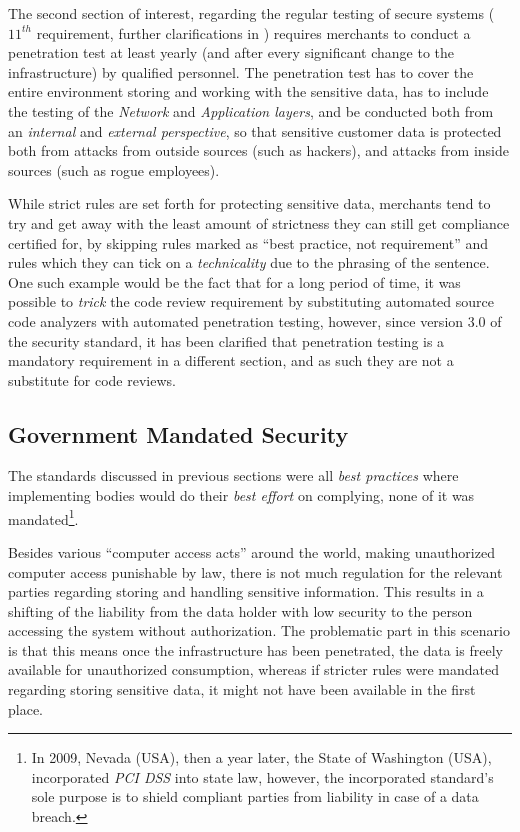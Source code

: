 \documentclass[a4paper,12pt]{article}
\begin{document}
	The second section of interest, regarding the regular testing of secure systems ($11^{th}$ requirement, further clarifications in \cite{pcireq11}) requires merchants to conduct a penetration test at least yearly (and after every significant change to the infrastructure) by qualified personnel. The penetration test has to cover the entire environment storing and working with the sensitive data, has to include the testing of the \textit{Network} and \textit{Application layers}, and be conducted both from an \textit{internal} and \textit{external perspective}, so that sensitive customer data is protected both from attacks from outside sources (such as hackers), and attacks from inside sources (such as rogue employees).
	
	While strict rules are set forth for protecting sensitive data, merchants tend to try and get away with the least amount of strictness they can still get compliance certified for, by skipping rules marked as ``best practice, not requirement'' and rules which they can tick on a \textit{technicality} due to the phrasing of the sentence. One such example would be the fact that for a long period of time, it was possible to \textit{trick} the code review requirement by substituting automated source code analyzers with automated penetration testing, however, since version 3.0 of the security standard, it has been clarified that penetration testing is a mandatory requirement in a different section, and as such they are not a substitute for code reviews.
	
\subsection{Government Mandated Security} \label{govmansec}
 
	
	The standards discussed in previous sections were all \textit{best practices} where implementing bodies would do their \textit{best effort} on complying, none of it was mandated\footnote{In 2009, Nevada (USA), then a year later, the State of Washington (USA), incorporated \textit{PCI DSS} into state law\cite{wash10}, however, the incorporated standard's sole purpose is to shield compliant parties from liability in case of a data breach.}.
	
	Besides various ``computer access acts'' around the world, making unauthorized computer access punishable by law, there is not much regulation for the relevant parties regarding storing and handling sensitive information. This results in a shifting of the liability from the data holder with low security to the person accessing the system without authorization. The problematic part in this scenario is that this means once the infrastructure has been penetrated, the data is freely available for unauthorized consumption, whereas if stricter rules were mandated regarding storing sensitive data, it might not have been available in the first place.
	
\end{document}
